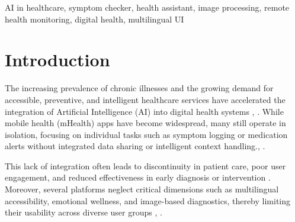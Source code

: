 \documentclass[conference]{IEEEtran}
\begin{document}
\begin{abstract}
The increasing demand for accessible and proactive healthcare has led to the emergence of intelligent digital health platforms. This project proposes the development of an AI-powered health assistant and management system that integrates multiple healthcare services into a unified framework. The platform is designed to assist users in monitoring their health through symptom analysis, vitals tracking, mood assessment, and nutrition guidance. It includes additional support modules such as image-based jaundice detection, emergency SOS alerts, and appointment scheduling. Emphasis is placed on user personalization, multilingual accessibility, and responsive alert systems. The platform employs a modular stack—Flask (Python) for backend services, standard web technologies for UI, SQLite for lightweight data persistence, OpenCV for visual diagnostics, and Twilio for real-time SMS alerts. The modular design enables scalability and adaptability, positioning the system as a comprehensive tool for preventive care and self-managed wellness.
\end{abstract}

\begin{IEEEkeywords}
AI in healthcare, symptom checker, health assistant, image processing, remote health monitoring, digital health, multilingual UI
\end{IEEEkeywords}


\section{Introduction}

The increasing prevalence of chronic illnesses and the growing demand for accessible, preventive, and intelligent healthcare services have accelerated the integration of Artificial Intelligence (AI) into digital health systems \cite{topol2019deep}, \cite{rajkomar2019machine}. While mobile health (mHealth) apps have become widespread, many still operate in isolation, focusing on individual tasks such as symptom logging or medication alerts without integrated data sharing or intelligent context handling.\cite{karim2023aihealth}, \cite{mahapatra2023remote}.

This lack of integration often leads to discontinuity in patient care, poor user engagement, and reduced effectiveness in early diagnosis or intervention \cite{banerjee2024literacy}. Moreover, several platforms neglect critical dimensions such as multilingual accessibility, emotional wellness, and image-based diagnostics, thereby limiting their usability across diverse user groups \cite{srivastava2020multilingual}, \cite{muller2024threats}.
\end{document}
